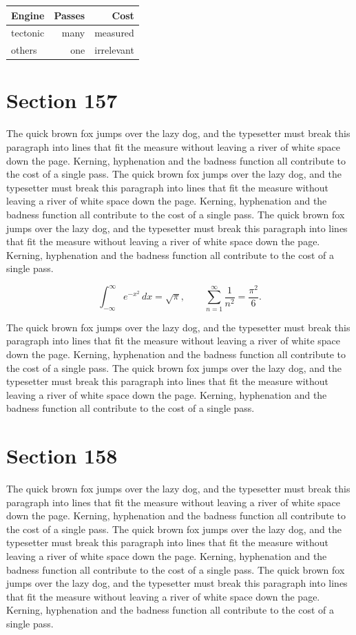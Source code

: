 \documentclass{article}
\begin{document}
\begin{center}
\begin{tabular}{lrr}
\toprule
Engine & Passes & Cost \\
\midrule
tectonic & many & measured \\
others & one & irrelevant \\
\bottomrule
\end{tabular}
\end{center}

\section{Section 157}
The quick brown fox jumps over the lazy dog, and the typesetter must break this paragraph into lines that fit the measure without leaving a river of white space down the page. Kerning, hyphenation and the badness function all contribute to the cost of a single pass. The quick brown fox jumps over the lazy dog, and the typesetter must break this paragraph into lines that fit the measure without leaving a river of white space down the page. Kerning, hyphenation and the badness function all contribute to the cost of a single pass. The quick brown fox jumps over the lazy dog, and the typesetter must break this paragraph into lines that fit the measure without leaving a river of white space down the page. Kerning, hyphenation and the badness function all contribute to the cost of a single pass. 

\begin{equation}
\int_{-\infty}^{\infty} e^{-x^{2}}\,dx = \sqrt{\pi}, \qquad
\sum_{n=1}^{\infty} \frac{1}{n^{2}} = \frac{\pi^{2}}{6}.
\end{equation}

The quick brown fox jumps over the lazy dog, and the typesetter must break this paragraph into lines that fit the measure without leaving a river of white space down the page. Kerning, hyphenation and the badness function all contribute to the cost of a single pass. The quick brown fox jumps over the lazy dog, and the typesetter must break this paragraph into lines that fit the measure without leaving a river of white space down the page. Kerning, hyphenation and the badness function all contribute to the cost of a single pass. 
\section{Section 158}
The quick brown fox jumps over the lazy dog, and the typesetter must break this paragraph into lines that fit the measure without leaving a river of white space down the page. Kerning, hyphenation and the badness function all contribute to the cost of a single pass. The quick brown fox jumps over the lazy dog, and the typesetter must break this paragraph into lines that fit the measure without leaving a river of white space down the page. Kerning, hyphenation and the badness function all contribute to the cost of a single pass. The quick brown fox jumps over the lazy dog, and the typesetter must break this paragraph into lines that fit the measure without leaving a river of white space down the page. Kerning, hyphenation and the badness function all contribute to the cost of a single pass. 
\end{document}

